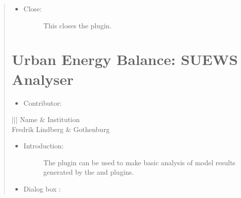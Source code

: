 \documentclass[letterpaper,10pt,english]{sphinxmanual}
\begin{document}
\begin{quote}
\begin{itemize}
\begin{description}
\end{description}

\item {} \begin{description}
\item[{Close:}] \leavevmode
This closes the plugin.

\end{description}

\end{itemize}


\section{Urban Energy Balance: SUEWS Analyser}
\label{\detokenize{post_processor/Urban Energy Balance SUEWS Analyser:urban-energy-balance-suews-analyser}}\label{\detokenize{post_processor/Urban Energy Balance SUEWS Analyser:suewsanalyser}}\label{\detokenize{post_processor/Urban Energy Balance SUEWS Analyser::doc}}\begin{itemize}
\item {} 
Contributor:

\end{itemize}


\begin{savenotes}\sphinxattablestart
\centering
\begin{tabular}[t]{|||}
\hline
\sphinxstyletheadfamily 
Name
&\sphinxstyletheadfamily 
Institution
\\
\hline
Fredrik Lindberg
&
Gothenburg
\\
\hline
\end{tabular}
\par
\sphinxattableend\end{savenotes}
\begin{itemize}
\item {} \begin{description}
\item[{Introduction:}] \leavevmode
The  plugin can be used to make basic analysis of model results generated by the  and  plugins.

\end{description}

\item {} 
Dialog box  :

\end{itemize}

\begin{figure}[htbp]
\centering
\capstart


\end{figure}
\end{quote}
\end{document}
